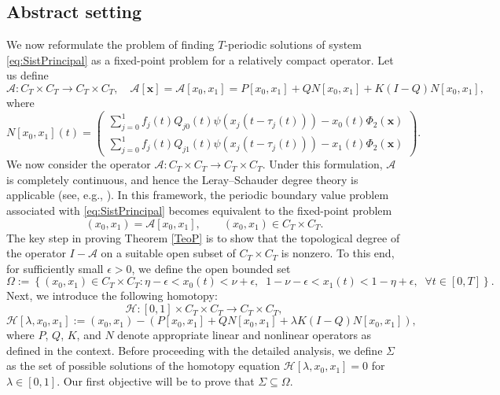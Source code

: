 \documentclass[11pt,reqno]{amsart}
\theoremstyle{definition}
\begin{document}
\subsection{Abstract setting}
We now reformulate the problem of finding $T$-periodic solutions of system \eqref{eq:SistPrincipal} as a fixed-point problem for a relatively compact operator. Let us define
\begin{equation*}\mathcal{A} :C_T\times C_T\to C_T\times C_T,\quad \mathcal{A}[\mathbf{x}]= \mathcal{A} [x_0,x_1] =P[x_0,x_1] +QN[x_0,x_1] +K(I-Q)N[x_0,x_1],
\end{equation*}
where $$N[x_0,x_1] (t)=  
\left(\begin{array}{lr}  \displaystyle\sum_{j=0}^1f_j(t)Q_{j0}(t)\psi(x_j(t-\tau_{j}(t)))-x_0(t)\Phi_{2}(\mathbf{x})\\  \displaystyle\sum_{j=0}^1f_j(t)Q_{j1}(t)\psi(x_j(t-\tau_{j}(t)))-x_1(t)\Phi_{2}(\mathbf{x})\end{array}\right).$$
We now consider the operator $\mathcal{A} : C_T \times C_T \to C_T \times C_T$. Under this formulation, $\mathcal{A}$ is completely continuous, and hence the Leray--Schauder degree theory is applicable (see, e.g., \cite{Mawhin}). In this framework, the periodic boundary value problem associated with \eqref{eq:SistPrincipal} becomes equivalent to the fixed-point problem
\begin{equation*}\label{opecu}
(x_0, x_1) = \mathcal{A}[x_0, x_1], \qquad (x_0, x_1) \in C_T \times C_T.
\end{equation*}
The key step in proving Theorem \ref{TeoP} is to show that the topological degree of the operator $I - \mathcal{A}$ on a suitable open subset of $C_T \times C_T$ is nonzero.
To this end, for sufficiently small $\epsilon > 0$, we define the open bounded set
$$
\Omega := \left\{(x_0, x_1) \in C_T \times C_T : \eta - \epsilon < x_0(t) < \nu + \epsilon, \;\; 1 - \nu - \epsilon < x_1(t) < 1 - \eta + \epsilon, \;\; \forall t \in [0, T] \right\}.
$$
Next, we introduce the following homotopy:
$$
\mathcal{H} : [0,1] \times C_T \times C_T \to C_T \times C_T,
$$
$$
\mathcal{H}[\lambda, x_0, x_1] := (x_0, x_1) - \left(P[x_0, x_1] + QN[x_0, x_1] + \lambda K(I - Q)N[x_0, x_1]\right),
$$
where $P$, $Q$, $K$, and $N$ denote appropriate linear and nonlinear operators as defined in the context.
Before proceeding with the detailed analysis, we define $\Sigma$ as the set of possible solutions of the homotopy equation $\mathcal{H}[\lambda, x_0, x_1] = 0$ for $\lambda \in [0,1]$. Our first objective will be to prove that $\Sigma \subseteq \Omega$.
\end{document}
